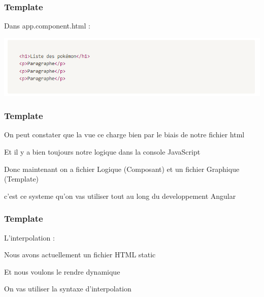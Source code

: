 \documentclass[10pt]{beamer}
\begin{document}
	\begin{frame}
		\frametitle{Template}

		Dans app.component.html : \newline

		\centering
		\includegraphics[width=14cm]{assets/templateHtml} \newline

	\end{frame}

	\begin{frame}
		\frametitle{Template}

		On peut constater que la vue ce charge bien par le biais de notre fichier html \newline \newline

		Et il y a bien toujours notre logique dans la console JavaScript  \newline \newline

		Donc maintenant on a fichier \alert{Logique} (Composant) et un fichier \alert{Graphique} (Template) \newline \newline

		c’est ce systeme qu’on vas utiliser tout au long du developpement Angular

	\end{frame}

	\begin{frame}
		\frametitle{Template}

		L'interpolation : \newline \newline

		Nous avons actuellement un fichier HTML \alert{static} \newline \newline

		Et nous voulons le rendre \alert{dynamique} \newline \newline

		On vas utiliser la syntaxe d’interpolation


	\end{frame}
\end{document}
